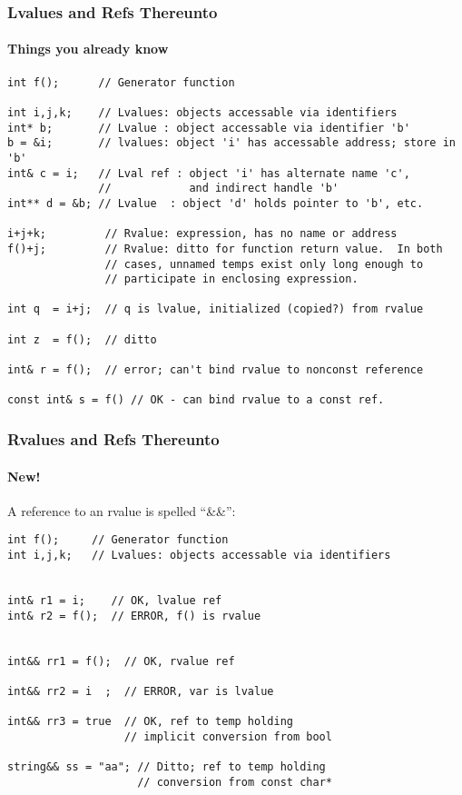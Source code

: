 \begin{frame}[fragile]
\frametitle{Lvalues and Refs Thereunto}
\framesubtitle{Things you already know}
{\scriptsize
\begin{verbatim}
int f();      // Generator function

int i,j,k;    // Lvalues: objects accessable via identifiers
int* b;       // Lvalue : object accessable via identifier 'b'
b = &i;       // lvalues: object 'i' has accessable address; store in 'b'
int& c = i;   // Lval ref : object 'i' has alternate name 'c',
              //            and indirect handle 'b'
int** d = &b; // Lvalue  : object 'd' holds pointer to 'b', etc.

i+j+k;         // Rvalue: expression, has no name or address
f()+j;         // Rvalue: ditto for function return value.  In both
               // cases, unnamed temps exist only long enough to 
               // participate in enclosing expression.

int q  = i+j;  // q is lvalue, initialized (copied?) from rvalue

int z  = f();  // ditto

int& r = f();  // error; can't bind rvalue to nonconst reference

const int& s = f() // OK - can bind rvalue to a const ref.
\end{verbatim}
}
\vskip 12pt
\end{frame}


\begin{frame}[fragile]
\frametitle{Rvalues and Refs Thereunto}
\framesubtitle{New!}

A reference to an rvalue is spelled ``\&\&'':
{\scriptsize
\begin{verbatim}
int f();     // Generator function
int i,j,k;   // Lvalues: objects accessable via identifiers


int& r1 = i;    // OK, lvalue ref
int& r2 = f();  // ERROR, f() is rvalue


int&& rr1 = f();  // OK, rvalue ref

int&& rr2 = i  ;  // ERROR, var is lvalue

int&& rr3 = true  // OK, ref to temp holding
                  // implicit conversion from bool

string&& ss = "aa"; // Ditto; ref to temp holding
                    // conversion from const char*

\end{verbatim}
}

\end{frame}


